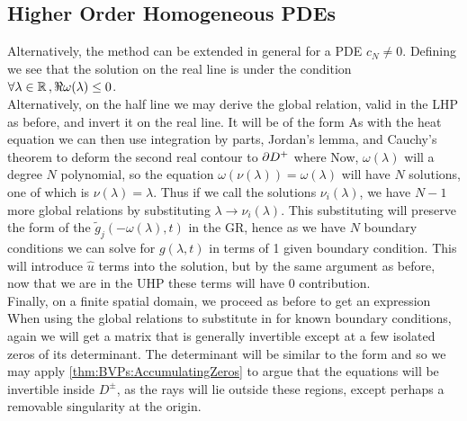\documentclass{article}
\begin{document}
\subsection{Higher Order Homogeneous PDEs}
Alternatively, the method can be extended in general for a PDE
$c_N \neq 0$. Defining 
we see that the solution on the real line is 
under the condition $\forall \lambda \in \mathbb{R} \,, \Re \omega(\lambda) \leq 0 $. \\
Alternatively, on the half line we may derive the global relation, valid in the LHP as before, and invert it on the real line. It will be of the form 
As with the heat equation we can then use integration by parts, Jordan's lemma, and Cauchy's theorem to deform the second real contour to $\partial D^+$ where
Now, $\omega(\lambda)$ will a degree $N$ polynomial, so the equation $\omega(\nu(\lambda)) = \omega(\lambda)$ will have $N$ solutions, one of which is $\nu(\lambda) = \lambda$. Thus if we call the solutions $\nu_i(\lambda)$, we have $N-1$ more global relations by substituting $\lambda \to \nu_i(\lambda)$. This substituting will preserve the form of the $\tilde{g}_j(-\omega(\lambda),t)$ in the GR, hence as we have $N$ boundary conditions we can solve for $g(\lambda,t)$ in terms of 1 given boundary condition. This will introduce $\hat{u}$ terms into the solution, but by the same argument as before, now that we are in the UHP these terms will have 0 contribution. \\
Finally, on a finite spatial domain, we proceed as before to get an expression 
When using the global relations to substitute in for known boundary conditions, again we will get a matrix that is generally invertible except at a few isolated zeros of its determinant. The determinant will be similar to the form 
and so we may apply \ref{thm:BVPs:AccumulatingZeros} to argue that the equations will be invertible inside $D^\pm$, as the rays will lie outside these regions, except perhaps a removable singularity at the origin. 

\end{document}

